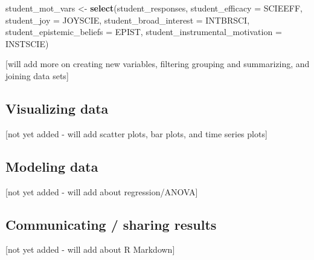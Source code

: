 \documentclass[]{article}
\newenvironment{Shaded}{\begin{snugshade}}{\end{snugshade}}
\newcommand{\KeywordTok}[1]{\textcolor[rgb]{0.13,0.29,0.53}{\textbf{#1}}}
\newcommand{\DataTypeTok}[1]{\textcolor[rgb]{0.13,0.29,0.53}{#1}}
\newcommand{\StringTok}[1]{\textcolor[rgb]{0.31,0.60,0.02}{#1}}
\newcommand{\NormalTok}[1]{#1}
\begin{document}
\begin{Shaded}
\begin{Highlighting}[]
\NormalTok{student_mot_vars <-}\StringTok{ }\KeywordTok{select}\NormalTok{(student_responses,}
                            \DataTypeTok{student_efficacy =}\NormalTok{ SCIEEFF,}
                            \DataTypeTok{student_joy =}\NormalTok{ JOYSCIE,}
                            \DataTypeTok{student_broad_interest =}\NormalTok{ INTBRSCI,}
                            \DataTypeTok{student_epistemic_beliefs =}\NormalTok{ EPIST,}
                            \DataTypeTok{student_instrumental_motivation =}\NormalTok{ INSTSCIE)}
\end{Highlighting}
\end{Shaded}

{[}will add more on creating new variables, filtering grouping and
summarizing, and joining data sets{]}

\subsection{Visualizing data}\label{visualizing-data}

{[}not yet added - will add scatter plots, bar plots, and time series
plots{]}

\subsection{Modeling data}\label{modeling-data}

{[}not yet added - will add about regression/ANOVA{]}

\subsection{Communicating / sharing
results}\label{communicating-sharing-results}

{[}not yet added - will add about R Markdown{]}
\end{document}
